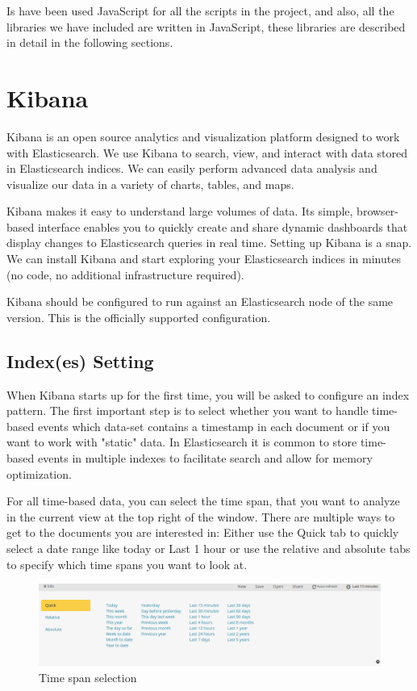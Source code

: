 \documentclass[a4paper, 12pt]{book}
\begin{document}
Is have been used JavaScript for all the scripts in the project, and also, all the libraries we have included are written in JavaScript, these libraries are described in detail in the following sections.  

 \section{Kibana}
\label{sec:kibana}
Kibana is an open source analytics and visualization platform designed to work with Elasticsearch. We use Kibana to search, view, and interact with data stored in Elasticsearch indices. We can easily perform advanced data analysis and visualize our data in a variety of charts, tables, and maps.

Kibana makes it easy to understand large volumes of data. Its simple, browser-based interface enables you to quickly create and share dynamic dashboards that display changes to Elasticsearch queries in real time. 	Setting up Kibana is a snap. We can install Kibana and start exploring your Elasticsearch indices in minutes (no code, no additional infrastructure required).

Kibana should be configured to run against an Elasticsearch node of the same version. This is the officially supported configuration.

\subsection{Index(es) Setting}
When Kibana starts up for the first time, you will be asked to configure an index pattern. The first important step is to select whether you want to handle time-based events which data-set contains a timestamp in each document or if you want to work with "static" data. In Elasticsearch it is common to store time-based events in multiple indexes to facilitate search and allow for memory optimization.

For all time-based data, you can select the time span, that you want to analyze in the current view at the top right of the window. There are multiple ways to get to the documents you are interested in: Either use the Quick tab to quickly select a date range like today or Last 1 hour or use the relative and absolute tabs to specify which time spans you want to look at.

\begin{figure}[H]
  \centering
  \includegraphics[width=16cm, keepaspectratio]{img/context/timespan}
  \caption{Time span selection}
  \label{fig:timespan}
\end{figure}
\end{document}
